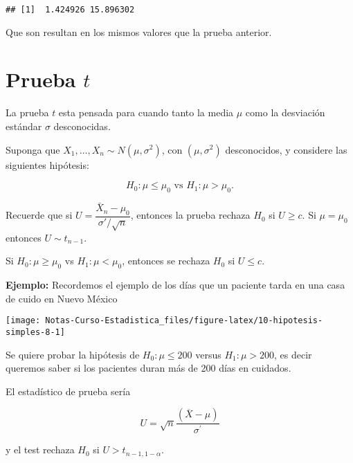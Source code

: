 \documentclass[
  12pt,
]{book}
\newenvironment{Shaded}{\begin{snugshade}}{\end{snugshade}}
\newcommand{\KeywordTok}[1]{\textcolor[rgb]{0.13,0.29,0.53}{\textbf{#1}}}
\newcommand{\NormalTok}[1]{#1}
\newcommand{\OperatorTok}[1]{\textcolor[rgb]{0.81,0.36,0.00}{\textbf{#1}}}
\newcommand{\StringTok}[1]{\textcolor[rgb]{0.31,0.60,0.02}{#1}}
\begin{document}
\begin{verbatim}
## [1]  1.424926 15.896302
\end{verbatim}

Que son resultan en los mismos valores que la prueba anterior.

\hypertarget{prueba-t}{%
\section{\texorpdfstring{Prueba \(t\)}{Prueba t}}\label{prueba-t}}

La prueba \(t\) esta pensada para cuando tanto la media \(\mu\) como la
desviación estándar \(\sigma\) desconocidas.

Suponga que \(X_1,\dots, X_n \sim N(\mu,\sigma^2)\), con \((\mu,\sigma^2)\)
desconocidos, y considere las siguientes hipótesis:

\[H_0: \mu\leq\mu_0 \text{ vs } H_1:\mu>\mu_0.\]

Recuerde que si \(U = \dfrac{\bar X_n -\mu_0}{\sigma' /\sqrt n}\), entonces la
prueba rechaza \(H_0\) si \(U\geq c\). Si \(\mu=\mu_0\) entonces \(U \sim t_{n-1}\).

Si \(H_0: \mu\geq\mu_0\) vs \(H_1: \mu<\mu_0\), entonces se rechaza \(H_0\) si \(U\leq c\).

\textbf{Ejemplo:} Recordemos el ejemplo de los días que un paciente tarda en una casa
de cuido en Nuevo México

\begin{Shaded}
\end{Shaded}

\begin{center}\texttt{[image: Notas-Curso-Estadistica\_files/figure-latex/10-hipotesis-simples-8-1]} \end{center}

Se quiere probar la hipótesis de \(H_{0}: \mu \leq 200\) versus \(H_{1}: \mu > 200\),
es decir queremos saber si los pacientes duran más de 200 días en cuidados.

El estadístico de prueba sería

\[
U =  \sqrt{n} \frac{(\overline{X} - \mu)}{\sigma ^{\prime}}
\]

y el test rechaza \(H_{0}\) si \(U>t_{n-1, 1-\alpha}\).
\end{document}
